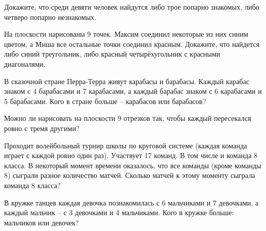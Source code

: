 \begin{ex}
    Докажите, что среди девяти человек найдутся либо трое попарно знакомых, либо четверо попарно незнакомых.
\end{ex}

\begin{ex} \label{10.3 ex11}
    На плоскости нарисованы 9 точек. Максим соединил некоторые из них синим цветом, а Миша все остальные точки соединил красным. Докажите, что найдется либо синий треугольник, либо красный четырёхугольник с красными диагоналями.
\end{ex}

\begin{ex}
    В сказочной стране Перра-Терра живут карабасы и барабасы. Каждый карабас знаком с 4 барабасами и 7 карабасами, а каждый барабас знаком с 6 карабасами и 5 барабасами. Кого в стране больше – карабасов или барабасов?
\end{ex}

\begin{ex}
    Можно ли нарисовать на плоскости 9 отрезков так, чтобы каждый пересекался ровно с тремя другими?
\end{ex}

\begin{ex} \label{10.3 ex14}
    Проходит волейбольный турнир школы по круговой системе (каждая команда играет с каждой ровно один раз). Участвует 17 команд. В том числе и команда 8 класса. В некоторый момент времени оказалось, что все команды (кроме команды 8) сыграли разное количество матчей. Сколько матчей к этому моменту сыграла команда 8 класса?
\end{ex}

\begin{ex} \label{10.3 ex15}
    В кружке танцев каждая девочка познакомилась с 6 мальчиками и 7 девочками, а каждый мальчик -- с 3 девочками и 4 мальчиками. Кого в кружке больше: мальчиков или девочек?
\end{ex}

